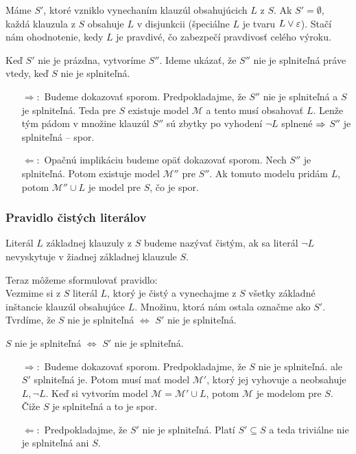 \begin{dokaz}
    Máme $S'$, ktoré vzniklo vynechaním klauzúl obsahujúcich $L$ z $S$.
    Ak $S'=\emptyset$, každá klauzula z $S$ obsahuje $L$ v disjunkcii
    (špeciálne $L$ je tvaru $L \lor \varepsilon$).
    Stačí nám ohodnotenie, kedy $L$ je pravdivé, čo zabezpečí
    pravdivosť celého výroku. 

    Keď $S'$ nie je prázdna, vytvoríme $S''$.
    Ideme ukázať, že $S''$ nie je splniteľná práve vtedy,
    keď $S$ nie je splniteľná.

    \begin{itemize}
    \item[$\Rightarrow:$] Budeme dokazovať sporom.
        Predpokladajme, že $S''$ nie je splniteľná a $S$ je splniteľná.
        Teda pre $S$ existuje model $\mathcal{M}$ a tento musí obsahovať $L$.
        Lenže tým pádom v množine klauzúl $S''$ sú zbytky po vyhodení
        $\neg L$ splnené $\Rightarrow$ $S''$ je splniteľná -- spor.

    \item[$\Leftarrow:$] Opačnú implikáciu budeme opäť dokazovať sporom.
        Nech $S''$ je splniteľná. Potom existuje model
        $\mathcal{M}''$ pre $S''$. Ak tomuto modelu pridám $L$, potom
        $\mathcal{M}'' \cup L$ je model pre $S$, čo je spor.
    \end{itemize}
\end{dokaz}
\subsubsection{Pravidlo čistých literálov}

\begin{definicia}
    Literál $L$ základnej klauzuly z $S$ budeme nazývať čistým,
    ak sa literál $\neg L$ nevyskytuje v žiadnej základnej klauzule $S$.
\end{definicia}

\noindent
Teraz môžeme sformulovať pravidlo: \\
Vezmime si z $S$ literál $L$, ktorý je čistý
a vynechajme z $S$ všetky základné inštancie klauzúl obsahujúce $L$.
Množinu, ktorá nám ostala označme ako $S'$.
Tvrdíme, že $S$ nie je splniteľná $\iff$ $S'$ nie je splniteľná.


\begin{dokaz}
    $S$ nie je splniteľná $\iff$ $S'$ nie je splniteľná.
    \begin{itemize}
    \item[$\Rightarrow:$] Budeme dokazovať sporom.
        Predpokladajme, že $S$ nie je splniteľná.
        ale $S'$ splniteľná je. Potom musí mať
        model $\mathcal{M}'$, ktorý jej vyhovuje a neobsahuje
        $L, \neg L$.  Keď si vytvorím model $\mathcal{M}=\mathcal{M}'\cup L$,
        potom $\mathcal{M}$ je modelom pre $S$. Čiže
        $S$ je splniteľná a to je spor.

    \item[$\Leftarrow:$] Predpokladajme, že
        $S'$ nie je splniteľná. Platí $S' \subseteq S$ a teda
        triviálne nie je splniteľná ani $S$.
    \end{itemize}
\end{dokaz}

